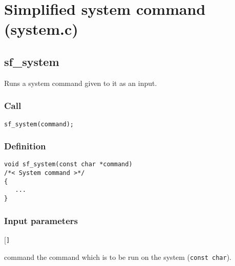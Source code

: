 \section{Simplified system command (system.c)}




\subsection{{sf\_system}}
Runs a system command given to it as an input.

\subsubsection*{Call}
\begin{verbatim}sf_system(command);\end{verbatim}

\subsubsection*{Definition}
\begin{verbatim}
void sf_system(const char *command)
/*< System command >*/
{
   ...
}
\end{verbatim}

\subsubsection*{Input parameters}
\begin{desclist}{\tt }{\quad}[\tt ]
   \setlength\itemsep{0pt}
   \item[command] the command which is to be run on the system (\texttt{const char}).
\end{desclist}



